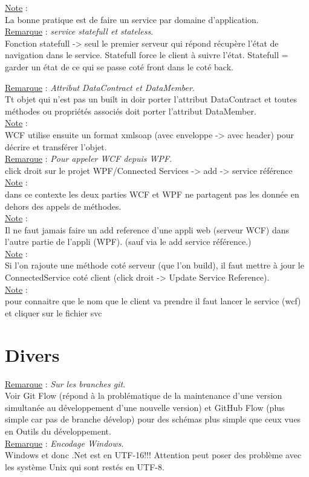 \documentclass[a4paper,12pt,twoside]{article}
\newcommand{\rem}[2]{\noindent\underline{Remarque} : \textit{#1}.\\ \indent #2}
\newcommand{\note}[1]{\noindent\underline{Note} : \\ \indent #1}
\begin{document}
\note{La bonne pratique est de faire un service par domaine d'application.}\\

\rem{service statefull et stateless}{Fonction statefull -> seul le premier serveur qui répond récupère l'état de navigation dans le service. Statefull force le client à suivre l'état. Statefull = garder un état de ce qui se passe coté front dans le coté back.}

\rem{Attribut DataContract et DataMember}{Tt objet qui n'est pas un built in doir porter l'attribut DataContract et toutes méthodes ou propriétés associés doit porter l'attribut DataMember.}\\

\note{WCF utilise ensuite un format xmlsoap (avec enveloppe -> avec header) pour décrire et transférer l'objet.}\\

\rem{Pour appeler WCF depuis WPF}{click droit sur le projet WPF/Connected Services -> add -> service référence}\\

\note{dans ce contexte les deux parties WCF et WPF ne partagent pas les donnée en dehors des appels de méthodes.}\\

\note{Il ne faut jamais faire un add reference d'une appli web (serveur WCF) dans l'autre partie de l'appli (WPF). (sauf via le add service référence.)}\\

\note{Si l'on rajoute une méthode coté serveur (que l'on build), il faut mettre à jour le ConnectedService coté client (click droit -> Update Service Reference).}\\

\note{pour connaitre que le nom que le client va prendre il faut lancer le service (wcf) et cliquer sur le fichier svc}


\section{Divers}

\rem{Sur les branches git}{Voir Git Flow (répond à la problématique de la maintenance d'une version simultanée au développement d'une nouvelle version) et GitHub Flow (plus simple car pas de branche dévelop) pour des schémas plus simple que ceux vues en Outils du développement.}\\

\rem{Encodage Windows}{Windows et donc .Net est en UTF-16!!! Attention peut poser des problème avec les système Unix qui sont restés en UTF-8.}\\
\end{document}
